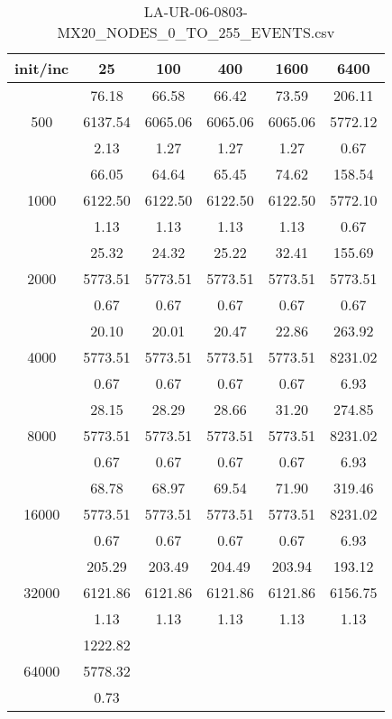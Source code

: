 \begin{table}[th]
\caption{LA-UR-06-0803-MX20\_NODES\_0\_TO\_255\_EVENTS.csv}
\label{tab:LA-UR-06-0803-MX20_NODES_0_TO_255_EVENTS.csv}
\centering
\begin{tabular}{|c||c|c|c|c|c|}
\hline
init/inc & 25 & 100 & 400 & 1600 & 6400 \\ \hline \hline
  & 76.18 & 66.58 & 66.42 & 73.59 & 206.11\\ 
500  & 6137.54 & 6065.06 & 6065.06 & 6065.06 & 5772.12\\ 
  & 2.13 & 1.27 & 1.27 & 1.27 & 0.67\\ \hline 
  & 66.05 & 64.64 & 65.45 & 74.62 & 158.54\\ 
1000  & 6122.50 & 6122.50 & 6122.50 & 6122.50 & 5772.10\\ 
  & 1.13 & 1.13 & 1.13 & 1.13 & 0.67\\ \hline 
  & 25.32 & 24.32 & 25.22 & 32.41 & 155.69\\ 
2000  & 5773.51 & 5773.51 & 5773.51 & 5773.51 & 5773.51\\ 
  & 0.67 & 0.67 & 0.67 & 0.67 & 0.67\\ \hline 
  & 20.10 & 20.01 & 20.47 & 22.86 & 263.92\\ 
4000  & 5773.51 & 5773.51 & 5773.51 & 5773.51 & 8231.02\\ 
  & 0.67 & 0.67 & 0.67 & 0.67 & 6.93\\ \hline 
  & 28.15 & 28.29 & 28.66 & 31.20 & 274.85\\ 
8000  & 5773.51 & 5773.51 & 5773.51 & 5773.51 & 8231.02\\ 
  & 0.67 & 0.67 & 0.67 & 0.67 & 6.93\\ \hline 
  & 68.78 & 68.97 & 69.54 & 71.90 & 319.46\\ 
16000  & 5773.51 & 5773.51 & 5773.51 & 5773.51 & 8231.02\\ 
  & 0.67 & 0.67 & 0.67 & 0.67 & 6.93\\ \hline 
  & 205.29 & 203.49 & 204.49 & 203.94 & 193.12\\ 
32000  & 6121.86 & 6121.86 & 6121.86 & 6121.86 & 6156.75\\ 
  & 1.13 & 1.13 & 1.13 & 1.13 & 1.13\\ \hline 
  & 1222.82 &  &  &  & \\ 
64000  & 5778.32 &  &  &  & \\ 
  & 0.73 &  &  &  & \\ \hline 
\end{tabular}
\end{table}


